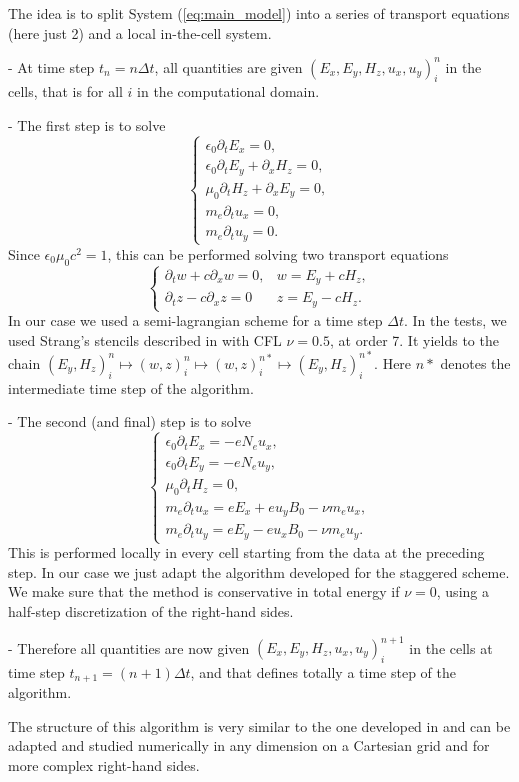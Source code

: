 The idea is to split 
System (\ref{eq:main_model})
into a series of  transport equations (here just 2) and a local in-the-cell system. 

- At time step $t_n=n\Delta t$, all quantities are given $(E_x,E_y, H_z, u_x,u_y)_{i}^n$ in the cells, that is for all $i$ in the 
computational domain.

- The first step is to solve 
$$
\left\{
\begin{array}{lll}
\epsilon_0\partial_t E_{x}=0,\\
\epsilon_0\partial_t E_{y}+\partial_x H_z=0,\\
\mu_0\partial_t H_z+\partial_x E_y=0,\\
m_e\partial_t u_x=0,\\
m_e\partial_t u_y=0.
\end{array}
\right.
$$
Since  $\epsilon_0 \mu_0c^2=1$, this can be  performed solving
two transport equations 
$$
\left\{
\begin{array}{lll}
\partial_t w +c \partial_x w=0, & w=E_{y}+ c H_z,  \\
\partial_t z -c \partial_x z=0& z=E_{y}-  c H_z.
\end{array}
\right.
$$
In our case we used 
a semi-lagrangian scheme for a time step $\Delta t$.
In the tests, we used Strang's stencils described in \cite{cedar} with CFL $\nu=0.5$, at order 7. 
It  yields to the chain 
$(E_y,H_z)_i^n\mapsto ( w,z)_i^n\mapsto ( w,z)_i^{n*}\mapsto (E_y,H_z)_i^{n*} $.
Here $n*$ denotes the intermediate time step of the algorithm.

- The second (and final) step is to solve
$$
\left\{\begin{array}{l}
\epsilon_0\partial_t E_{x}=-eN_e u_x,\\
\epsilon_0\partial_t E_{y}=-eN_e u_y,\\
\mu_0\partial_t H_z=0,\\
m_e\partial_t u_x=eE_x+eu_yB_0-\nu m_e u_x,\\
m_e\partial_t u_y=eE_y-eu_xB_0-\nu m_e u_y.
\end{array}
\right.$$
This is performed locally in every cell starting from the data at the preceding 
step. In our case we just adapt the algorithm developed for the staggered scheme.
We make sure that the method is conservative in total energy if $\nu=0$, using a half-step discretization
of the right-hand sides.

- Therefore  all quantities are now given $(E_x,E_y, H_z, u_x,u_y)_{i}^{n+1}$ in the cells 
at time step $t_{n+1}=(n+1)\Delta t$, and that defines totally a time step of the algorithm.


\begin{remark}
	The structure of this algorithm is very similar to the one developed in \cite{compfluids} and can be adapted and studied numerically
	in any dimension on a Cartesian grid and for more complex right-hand sides.
\end{remark}